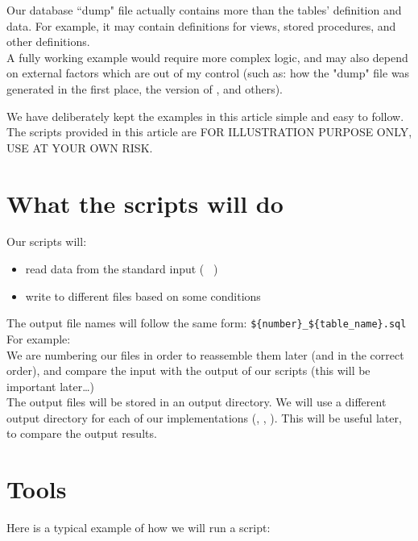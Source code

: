 Our database ``dump" file actually contains more than the tables' definition and data. For example, it may contain definitions for views, stored procedures, and other definitions. \\

A fully working example would require more complex logic, and may also depend on external factors which are out of my control (such as: how the "dump" file was generated in the first place, the version of \mysqldump, and others).

We have deliberately kept the examples in this article simple and easy to follow. \\

The scripts provided in this article are FOR ILLUSTRATION PURPOSE ONLY, USE AT YOUR OWN RISK.


\section*{What the scripts will do}

Our scripts will:
\begin{itemize}
	\item read data from the standard input ( \stdin\ )
	\item write to different files based on some conditions
\end{itemize}


The output file names will follow the same form: \newline
\lstinline|${number}_${table_name}.sql| \\

For example:  \\


We are numbering our files in order to reassemble them later (and in the correct order), and compare the input with the output of our scripts (this will be important later\dots) \\


The output files will be stored in an output directory. 
We will use a different output directory for each of our implementations (, , ). This will be useful later, to compare the output results.


\section*{Tools}

Here is a typical example of how we will run a script:

